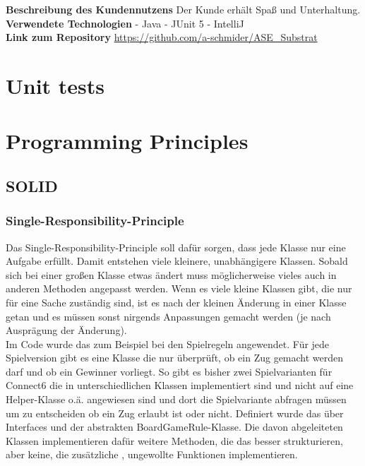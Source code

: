 \documentclass[12pt]{article}
\begin{document}
\noindent  \textbf{Beschreibung des Kundennutzens}
Der Kunde erhält Spaß und Unterhaltung.
\\

\noindent \textbf{Verwendete Technologien}
- Java
- JUnit 5
- IntelliJ
\\

\noindent \textbf{Link zum Repository}
\url{https://github.com/a-schmider/ASE_Substrat}





\newpage
\section{Unit tests}




\newpage
\section{Programming Principles}



\subsection{SOLID}


\subsubsection{Single-Responsibility-Principle}
Das Single-Responsibility-Principle soll dafür sorgen, dass jede Klasse nur eine Aufgabe erfüllt. Damit entstehen viele kleinere, unabhängigere Klassen. Sobald sich bei einer großen Klasse etwas ändert muss möglicherweise vieles auch in anderen Methoden angepasst werden. Wenn es viele kleine Klassen gibt, die nur für eine Sache zuständig sind, ist es nach der kleinen Änderung in einer Klasse getan und es müssen sonst nirgends Anpassungen gemacht werden (je nach Ausprägung der Änderung).
\\

Im Code wurde das zum Beispiel bei den Spielregeln angewendet. Für jede Spielversion gibt es eine Klasse die nur überprüft, ob ein Zug gemacht werden darf und ob ein Gewinner vorliegt. So gibt es bisher zwei Spielvarianten für Connect6 die in unterschiedlichen Klassen implementiert sind und nicht auf eine Helper-Klasse o.ä. angewiesen sind und dort die Spielvariante abfragen müssen um zu entscheiden ob ein Zug erlaubt ist oder nicht. Definiert wurde das über Interfaces und der abstrakten BoardGameRule-Klasse. Die davon abgeleiteten Klassen implementieren dafür weitere Methoden, die das besser strukturieren, aber keine, die zusätzliche , ungewollte Funktionen implementieren.
\end{document}
